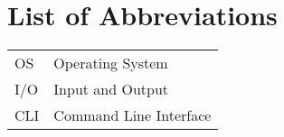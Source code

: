 \chapter*{List of Abbreviations}
{
\centering
\begin{tabular}{ l  l }
OS & Operating System \\
I/O & Input and Output \\
CLI & Command Line Interface \\
\end{tabular}
}
